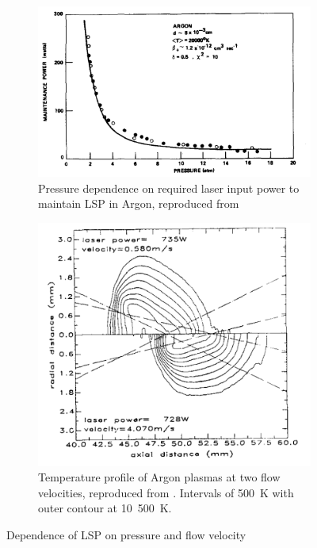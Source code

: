         \begin{figure}[h]
            \centering
            \begin{subfigure}[t]{0.50\textwidth}
                \centering
                \includegraphics[width=\textwidth]{assets/2 background/moody_ArgonLSP.png}
                \caption[Pressure dependence on required laser input power to maintain LSP in Argon]{Pressure dependence on required laser input power to maintain LSP in Argon, reproduced from \textcite{moodyMaintenanceGasBreakdown1975}}
                \label{fig:4_moodyArgon}
            \end{subfigure}
            \hfill
            \begin{subfigure}[t]{0.45\textwidth}
                \centering
                \includegraphics[width=\textwidth]{assets/2 background/welle_TProfile.png}
                \caption[Temperature profile of Argon plasmas at two flow velocities]{Temperature profile of Argon plasmas at two flow velocities, reproduced from \textcite{welleEnergyConversionEfficiency1986}. Intervals of 500~K with outer contour at 10~500~K.}
                \label{fig:4_LSPTProfile}
            \end{subfigure}
            \caption{Dependence of LSP on pressure and flow velocity}
            \label{fig:4_conditions}
        \end{figure}

